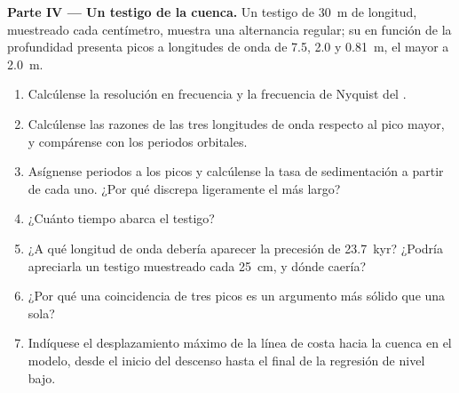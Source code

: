 \begin{problem}
\medskip\noindent\textbf{Parte IV --- Un testigo de la cuenca.} Un testigo
de \qty{30}{m} de longitud, muestreado cada centímetro, muestra una alternancia regular; su
 en función de la profundidad presenta picos a longitudes de onda de 7.5, 2.0 y \qty{0.81}{m},
el mayor a \qty{2.0}{m}.
\begin{enumerate}[resume]
\item Calcúlense la resolución en frecuencia y la frecuencia de Nyquist del
  .
\item Calcúlense las razones de las tres longitudes de onda respecto al pico mayor, y
  compárense con los periodos orbitales.
\item Asígnense periodos a los picos y calcúlense la tasa de sedimentación a partir de
  cada uno. ¿Por qué discrepa ligeramente el más largo?
\item ¿Cuánto tiempo abarca el testigo?
\item ¿A qué longitud de onda debería aparecer la precesión de \qty{23.7}{kyr}?
  ¿Podría apreciarla un testigo muestreado cada \qty{25}{cm}, y dónde caería?
\item ¿Por qué una coincidencia de tres picos es un argumento más sólido que una sola?
\item Indíquese el desplazamiento máximo de la línea de costa hacia la cuenca en el modelo, desde
  el inicio del descenso hasta el final de la regresión de nivel bajo.
\end{enumerate}
\end{problem}
